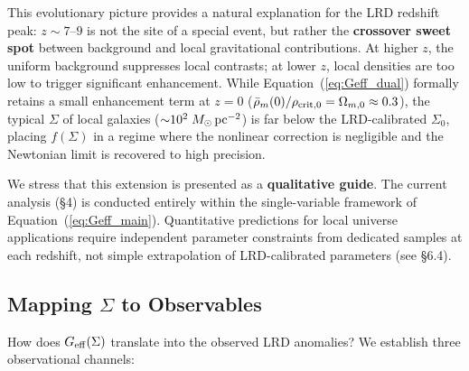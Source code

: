 \documentclass[apj,twocolumn,longbibliography,linenumbers]{aastex701}
\begin{document}
\begin{table}[h]
\caption{Evolutionary Phases of Density-Dependent Gravity}
\label{tab:evolution_phases}
\centering
\small
{}
\end{table}

This evolutionary picture provides a natural explanation for the LRD redshift peak: $z \sim 7$--$9$ is not the site of a special event, but rather the \textbf{crossover sweet spot} between background and local gravitational contributions. At higher $z$, the uniform background suppresses local contrasts; at lower $z$, local densities are too low to trigger significant enhancement. While Equation~(\ref{eq:Geff_dual}) formally retains a small enhancement term at $z = 0$ ($\bar{\rho}_m(0)/\rho_{\rm crit,0} = \Omega_{m,0} \approx 0.3$), the typical $\Sigma$ of local galaxies (${\sim}10^2\;M_\odot\,{\rm pc}^{-2}$) is far below the LRD-calibrated $\Sigma_0$, placing $f(\Sigma)$ in a regime where the nonlinear correction is negligible and the Newtonian limit is recovered to high precision.

We stress that this extension is presented as a \textbf{qualitative guide}. The current analysis (\S4) is conducted entirely within the single-variable framework of Equation~(\ref{eq:Geff_main}). Quantitative predictions for local universe applications require independent parameter constraints from dedicated samples at each redshift, not simple extrapolation of LRD-calibrated parameters (see \S6.4).

\subsection{Mapping $\Sigma$ to Observables}

How does $G_{\rm eff}(\Sigma)$ translate into the observed LRD anomalies? We establish three observational channels:
\end{document}
